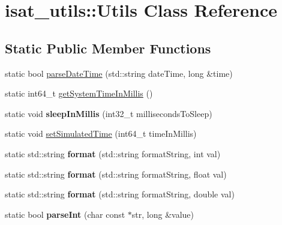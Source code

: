 \hypertarget{classisat__utils_1_1_utils}{}\section{isat\+\_\+utils\+:\+:Utils Class Reference}
\label{classisat__utils_1_1_utils}
\subsection*{Static Public Member Functions}
\begin{DoxyCompactItemize}
\item 
static bool \hyperlink{classisat__utils_1_1_utils_ab5b16b0b9ff7f3f458ab2d850eb259f3}{parse\+Date\+Time} (std\+::string date\+Time, long \&time)
\item 
static int64\+\_\+t \hyperlink{classisat__utils_1_1_utils_a53ee27a594f5c783daab94541541c19a}{get\+System\+Time\+In\+Millis} ()
\item 
static void {\bfseries sleep\+In\+Millis} (int32\+\_\+t milliseconds\+To\+Sleep)\hypertarget{classisat__utils_1_1_utils_aa6bda8826690467e799f3946a83ae61c}{}\label{classisat__utils_1_1_utils_aa6bda8826690467e799f3946a83ae61c}

\item 
static void \hyperlink{classisat__utils_1_1_utils_aecf0017a2fa4ec92bca1620955f01629}{set\+Simulated\+Time} (int64\+\_\+t time\+In\+Millis)
\item 
static std\+::string {\bfseries format} (std\+::string format\+String, int val)\hypertarget{classisat__utils_1_1_utils_a3222adf94ea040280b5876b0e1ea1f9e}{}\label{classisat__utils_1_1_utils_a3222adf94ea040280b5876b0e1ea1f9e}

\item 
static std\+::string {\bfseries format} (std\+::string format\+String, float val)\hypertarget{classisat__utils_1_1_utils_af0a66457baa12089b113ef40e770baf6}{}\label{classisat__utils_1_1_utils_af0a66457baa12089b113ef40e770baf6}

\item 
static std\+::string {\bfseries format} (std\+::string format\+String, double val)\hypertarget{classisat__utils_1_1_utils_ab255e2ac01e0672ffda860715450c1f4}{}\label{classisat__utils_1_1_utils_ab255e2ac01e0672ffda860715450c1f4}

\item 
static bool {\bfseries parse\+Int} (char const $\ast$str, long \&value)\hypertarget{classisat__utils_1_1_utils_acb7102260abd465e15e357eb08ea1972}{}\label{classisat__utils_1_1_utils_acb7102260abd465e15e357eb08ea1972}


\end{DoxyCompactItemize}
